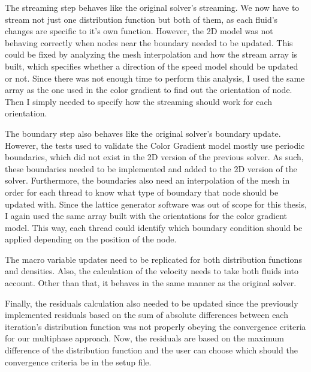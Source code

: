 \documentclass[12pt]{book}
\begin{document}
The streaming step behaves like the original solver's streaming. We now have to stream not just one distribution function but both of them, as each fluid's changes are specific to it's own function. However, the 2D model was not behaving correctly when nodes near the boundary needed to be updated. This could be fixed by analyzing the mesh interpolation and how the stream array is built, which specifies whether a direction of the speed model should be updated or not. Since there was not enough time to perform this analysis, I used the same array as the one used in the color gradient to find out the orientation of node. Then I simply needed to specify how the streaming should work for each orientation. \par
The boundary step also behaves like the original solver's boundary update. However, the tests used to validate the Color Gradient model mostly use periodic boundaries, which did not exist in the 2D version of the previous solver. As such, these boundaries needed to be implemented and added to the 2D version of the solver. Furthermore, the boundaries also need an interpolation of the mesh in order for each thread to know what type of boundary that node should be updated with. Since the lattice generator software was out of scope for this thesis, I again used the same array built with the orientations for the color gradient model. This way, each thread could identify which boundary condition should be applied depending on the position of the node. \par
The macro variable updates need to be replicated for both distribution functions and densities. Also, the calculation of the velocity needs to take both fluids into account. Other than that, it behaves in the same manner as the original solver. \par
Finally, the residuals calculation also needed to be updated since the previously implemented residuals based on the sum of absolute differences between each iteration's distribution function was not properly obeying the convergence criteria for our multiphase approach. Now, the residuals are based on the maximum difference of the distribution function and the user can choose which should the convergence criteria be in the setup file.    
\end{document}
